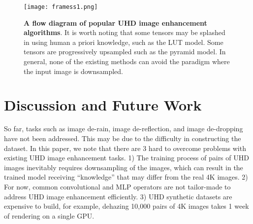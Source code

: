 \documentclass{article}
\begin{document}
	
%
%
%
%
%


%
%
%
%

\vspace{-0mm}
\begin{figure*}[h]
	\centering%
	\texttt{[image: framess1.png]}
	\caption{\textbf{A flow diagram of popular UHD image enhancement algorithms}. It is worth noting that some tensors may be splashed in using human a priori knowledge, such as the LUT model. Some tensors are progressively upsampled such as the pyramid model. In general, none of the existing methods can avoid the paradigm where the input image is downsampled.}
	\label{fig:fig1}
	\vspace{-0mm}
\end{figure*}


\section{Discussion and Future Work}
%
So far, tasks such as image de-rain, image de-reflection, and image de-dropping have not been addressed.
%
This may be due to the difficulty in constructing the dataset.
%
In this paper, we note that there are 3 hard to overcome problems with existing UHD image enhancement tasks.
%
1) The training process of pairs of UHD images inevitably requires downsampling of the images, which can result in the trained model receiving ``knowledge'' that may differ from the real 4K images.
%
2) For now, common convolutional and MLP operators are not tailor-made to address UHD image enhancement efficiently.
%
3) UHD synthetic datasets are expensive to build, for example, dehazing 10,000 pairs of 4K images takes 1 week of rendering on a single GPU.
%
\end{document}
